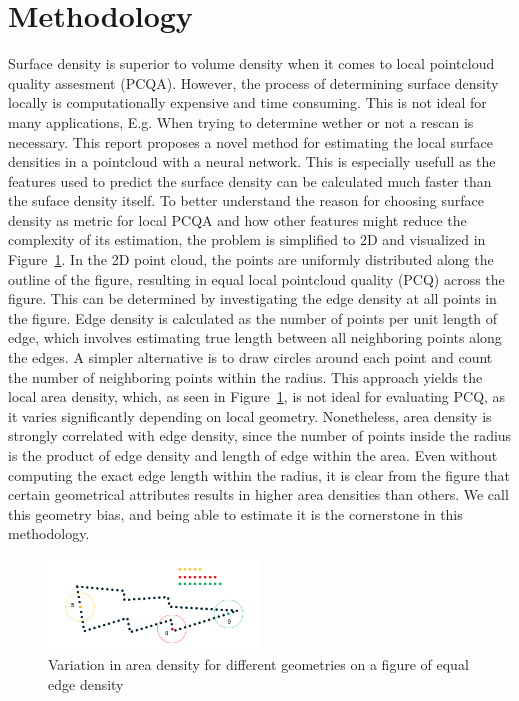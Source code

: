 \section{Methodology}
Surface density is superior to volume density when it comes to local pointcloud quality assesment (PCQA). However, the process of determining surface density locally is computationally expensive and time consuming. This is not ideal for many applications, E.g. When trying to determine wether or not a rescan is necessary. This report proposes a novel method for estimating the local surface densities in a pointcloud with a neural network. This is especially usefull as the features used to predict the surface density can be calculated much faster than the suface density itself. 
To better understand the reason for choosing surface density as metric for local PCQA and how other features might reduce the complexity of its estimation, the problem is simplified to 2D and visualized in Figure~\ref{fig:area_and_circumference}. In the 2D point cloud, the points are uniformly distributed along the outline of the figure, resulting in equal local pointcloud quality (PCQ) across the figure. This can be determined by investigating the edge density at all points in the figure. Edge density is calculated as the number of points per unit length of edge, which involves estimating true length between all neighboring points along the edges. 
A simpler alternative is to draw circles around each point and count the number of neighboring points within the radius. This approach yields the local area density, which, as seen in Figure~\ref{fig:area_and_circumference}, is not ideal for evaluating PCQ, as it varies significantly depending on local geometry. Nonetheless, area density is strongly correlated with edge density, since the number of points inside the radius is the product of edge density and length of edge within the area. 
Even without computing the exact edge length within the radius, it is clear from the figure that certain geometrical attributes results in higher area densities than others. We call this geometry bias, and being able to estimate it is the cornerstone in this methodology.

\begin{figure}[H]
    \centering
    \includegraphics[width=0.5\textwidth]{figures/Points_inside.png}
    \caption{Variation in area density for different geometries on a figure of equal edge density}\label{fig:area_and_circumference}
\end{figure}

